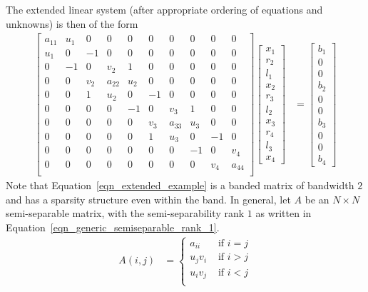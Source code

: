 \documentclass[times]{nlaauth}
\begin{document}
The extended linear system (after appropriate ordering of equations and unknowns) is then of the form
\begin{align}
\begin{bmatrix}
a_{11} & u_1 & 0 & 0 & 0 & 0 & 0 & 0 & 0 & 0\\
u_1 & 0 & -1 & 0 & 0 & 0 & 0 & 0 & 0 & 0\\
0 & -1 & 0 & v_2 & 1 & 0 & 0 & 0 & 0 & 0\\
0 & 0 & v_2 & a_{22} & u_2 & 0 & 0 & 0 & 0 & 0\\
0 & 0 & 1 & u_2 & 0 & -1 & 0 & 0 & 0 & 0\\
0 & 0 & 0 & 0 & -1 & 0 & v_3 & 1 & 0 & 0\\
0 & 0 & 0 & 0 & 0 & v_3 & a_{33} & u_3 & 0 & 0\\
0 & 0 & 0 & 0 & 0 & 1 & u_{3} & 0 & -1 & 0\\
0 & 0 & 0 & 0 & 0 & 0 & 0 & -1 & 0 & v_4\\
0 & 0 & 0 & 0 & 0 & 0 & 0 & 0 & v_4 & a_{44}\\
\end{bmatrix}
\begin{bmatrix}
x_1\\
r_2\\
l_1\\
x_2\\
r_3\\
l_2\\
x_3\\
r_4\\
l_3\\
x_4
\end{bmatrix}
& =
\begin{bmatrix}
b_1\\
0\\
0\\
b_2\\
0\\
0\\
b_3\\
0\\
0\\
b_4
\end{bmatrix}
\label{eqn_extended_example}
\end{align}
Note that Equation~\eqref{eqn_extended_example} is a banded matrix of bandwidth $2$ and has a sparsity structure even within the band. In general, let $A$ be an $N \times N$ semi-separable matrix, with the semi-separability rank $1$ as written in Equation~\eqref{eqn_generic_semiseparable_rank_1}.
\begin{align}
A(i,j) & =
\begin{cases}
a_{ii} & \text{ if }i=j\\
u_j v_i & \text{ if }i> j\\
u_i v_j & \text{ if }i< j\\
\end{cases}
\label{eqn_generic_semiseparable_rank_1}
\end{align}
\end{document}
